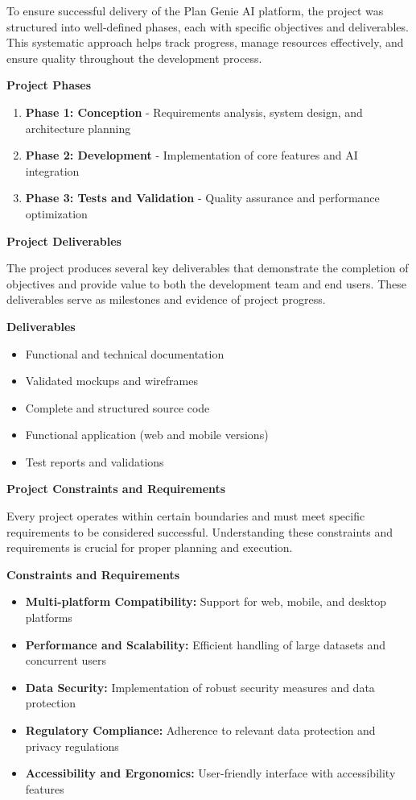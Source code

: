 \documentclass[12pt,a4paper]{article}
\begin{document}
To ensure successful delivery of the Plan Genie AI platform, the project was structured into well-defined phases, each with specific objectives and deliverables. This systematic approach helps track progress, manage resources effectively, and ensure quality throughout the development process.

\textbf{Project Phases}
\begin{enumerate}
    \item \textbf{Phase 1: Conception} - Requirements analysis, system design, and architecture planning
    \item \textbf{Phase 2: Development} - Implementation of core features and AI integration
    \item \textbf{Phase 3: Tests and Validation} - Quality assurance and performance optimization
\end{enumerate}

\textbf{Project Deliverables}

The project produces several key deliverables that demonstrate the completion of objectives and provide value to both the development team and end users. These deliverables serve as milestones and evidence of project progress.

\textbf{Deliverables}
\begin{itemize}
    \item Functional and technical documentation
    \item Validated mockups and wireframes
    \item Complete and structured source code
    \item Functional application (web and mobile versions)
    \item Test reports and validations
\end{itemize}

\textbf{Project Constraints and Requirements}

Every project operates within certain boundaries and must meet specific requirements to be considered successful. Understanding these constraints and requirements is crucial for proper planning and execution.

\textbf{Constraints and Requirements}
\begin{itemize}
    \item \textbf{Multi-platform Compatibility:} Support for web, mobile, and desktop platforms
    \item \textbf{Performance and Scalability:} Efficient handling of large datasets and concurrent users
    \item \textbf{Data Security:} Implementation of robust security measures and data protection
    \item \textbf{Regulatory Compliance:} Adherence to relevant data protection and privacy regulations
    \item \textbf{Accessibility and Ergonomics:} User-friendly interface with accessibility features
\end{itemize}
\end{document}
